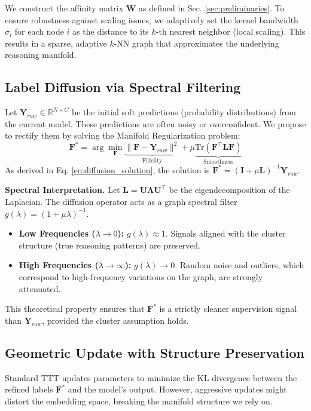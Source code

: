 \documentclass{article}
\theoremstyle{plain}
\theoremstyle{definition}
\theoremstyle{remark}
\newcommand{\R}{\mathbb{R}}
\newcommand{\W}{\mathbf{W}}        %
\newcommand{\Lap}{\mathbf{L}}      %
\newcommand{\F}{\mathbf{F}}        %
\newcommand{\Y}{\mathbf{Y}}        %
\begin{document}
We construct the affinity matrix $\W$ as defined in Sec. \ref{sec:preliminaries}. To ensure robustness against scaling issues, we adaptively set the kernel bandwidth $\sigma_i$ for each node $i$ as the distance to its $k$-th nearest neighbor (local scaling). This results in a sparse, adaptive $k$-NN graph that approximates the underlying reasoning manifold.

\subsection{Label Diffusion via Spectral Filtering}
Let $\Y_{raw} \in \R^{N \times C}$ be the initial soft predictions (probability distributions) from the current model. These predictions are often noisy or overconfident. We propose to rectify them by solving the Manifold Regularization problem:
\begin{equation}
    \F^* = \arg\min_{\F} \underbrace{\|\F - \Y_{raw}\|^2}_{\text{Fidelity}} + \mu \underbrace{\text{Tr}(\F^\top \Lap \F)}_{\text{Smoothness}}
\end{equation}
As derived in Eq. \eqref{eq:diffusion_solution}, the solution is $\F^* = (\mathbf{I} + \mu \Lap)^{-1} \Y_{raw}$.

\textbf{Spectral Interpretation.} Let $\Lap = \mathbf{U} \mathbf{\Lambda} \mathbf{U}^\top$ be the eigendecomposition of the Laplacian. The diffusion operator acts as a graph spectral filter $g(\lambda) = (1 + \mu \lambda)^{-1}$.
\begin{itemize}
    \item \textbf{Low Frequencies ($\lambda \to 0$):} $g(\lambda) \approx 1$. Signals aligned with the cluster structure (true reasoning patterns) are preserved.
    \item \textbf{High Frequencies ($\lambda \to \infty$):} $g(\lambda) \to 0$. Random noise and outliers, which correspond to high-frequency variations on the graph, are strongly attenuated.
\end{itemize}
This theoretical property ensures that $\F^*$ is a strictly cleaner supervision signal than $\Y_{raw}$, provided the cluster assumption holds.

\subsection{Geometric Update with Structure Preservation}
Standard TTT updates parameters to minimize the KL divergence between the refined labels $\F^*$ and the model's output. However, aggressive updates might distort the embedding space, breaking the manifold structure we rely on.
\end{document}

